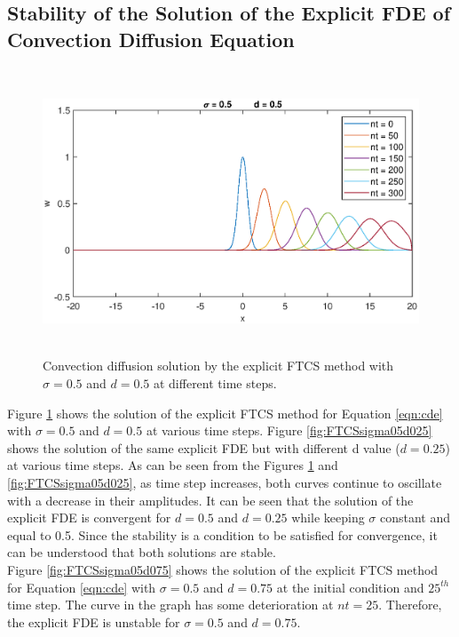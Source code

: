 \documentclass[letterpaper,12pt]{article}
\begin{document}
\subsection{Stability of the Solution of the Explicit FDE of Convection Diffusion Equation}
\begin{figure}[H] 
	\centering 
	\includegraphics[max height=8.5cm]{graphs/FTCS/ConvectionDiffusion/sigma05d05.eps}
	\caption{Convection diffusion solution by the explicit FTCS method with $\sigma= 0.5$ and $d=0.5$ at different time steps.}
 	\label{fig:FTCSsigma05d05}
\end{figure}
Figure \ref{fig:FTCSsigma05d05} shows the solution of the explicit FTCS
method for Equation \ref{eqn:cde} with $\sigma= 0.5$ and $d=0.5$ at various time steps.
Figure \ref{fig:FTCSsigma05d025} shows the solution of the same explicit FDE but with 
different d value ($d=0.25$) at various time steps. As can be seen from the Figures \ref{fig:FTCSsigma05d05}
and \ref{fig:FTCSsigma05d025}, as time step increases, both curves continue to oscillate with a decrease in their
amplitudes. It can be seen that the solution of the explicit FDE is convergent for $d=0.5$
and $d=0.25$ while keeping $\sigma$ constant and equal to 0.5. Since the stability is a condition
to be satisfied for convergence, it can be understood that both solutions are stable. \\
\indent Figure \ref{fig:FTCSsigma05d075} shows the solution of the explicit FTCS
method for Equation \ref{eqn:cde} with $\sigma= 0.5$ and $d=0.75$ at the initial condition
and $25^{th}$ time step. The curve in the graph has some deterioration at $nt = 25$. Therefore,
the explicit FDE is unstable for $\sigma= 0.5$ and $d=0.75$.
\end{document}
